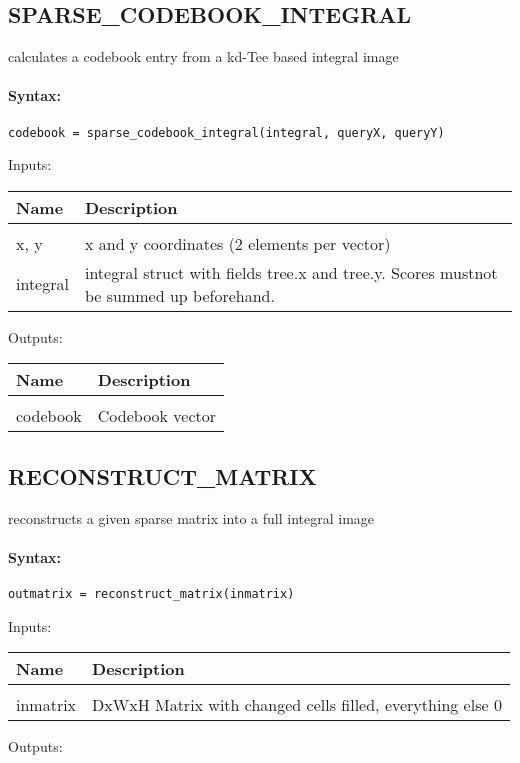 \subsection{SPARSE\_CODEBOOK\_INTEGRAL}

calculates a codebook entry from a kd-Tee based integral image

\paragraph{Syntax:} \verb|codebook = sparse_codebook_integral(integral, queryX, queryY)|

Inputs:

\begin{tabular}{|l|p{5cm}|}
\hline
\textbf{Name} & \textbf{Description} \\
\hline \hline \\
x, y & x and y coordinates (2 elements per vector)  \\ \hline
integral & integral struct with fields tree.x and tree.y. Scores mustnot be summed up beforehand.  \\ \hline
\end{tabular}
Outputs:

\begin{tabular}{|l|p{5cm}|}
\hline
\textbf{Name} & \textbf{Description} \\
\hline \hline \\
codebook & Codebook vector  \\ \hline
\end{tabular}

\subsection{RECONSTRUCT\_MATRIX}

reconstructs a given sparse matrix into a full integral image

\paragraph{Syntax:} \verb|outmatrix = reconstruct_matrix(inmatrix)|

Inputs:

\begin{tabular}{|l|p{5cm}|}
\hline
\textbf{Name} & \textbf{Description} \\
\hline \hline \\
inmatrix & DxWxH Matrix with changed cells filled, everything else 0  \\ \hline
\end{tabular}
Outputs:

